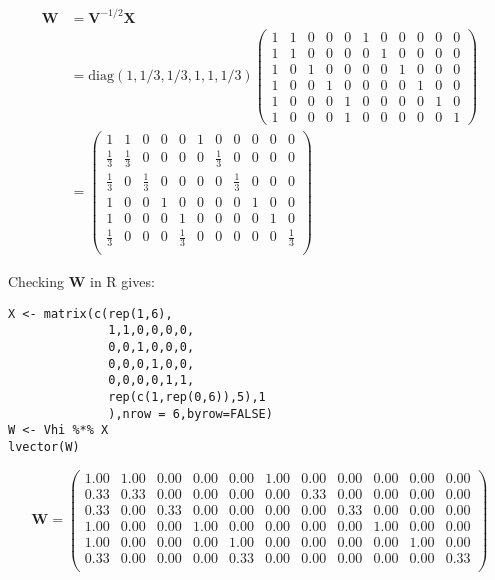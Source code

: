 \documentclass[11pt]{article}
\begin{document}
\begin{align*}
\mathbf{W} &= \mathbf{V}^{-1/2}\mathbf{X} \\
           &= \mathrm{diag}(1,1/3,1/3,1,1,1/3)\begin{pmatrix}
1 & 1 & 0 & 0 & 0 & 1 & 0 & 0 & 0 & 0 & 0 \\
1 & 1 & 0 & 0 & 0 & 0 & 1 & 0 & 0 & 0 & 0 \\
1 & 0 & 1 & 0 & 0 & 0 & 0 & 1 & 0 & 0 & 0 \\
1 & 0 & 0 & 1 & 0 & 0 & 0 & 0 & 1 & 0 & 0 \\
1 & 0 & 0 & 0 & 1 & 0 & 0 & 0 & 0 & 1 & 0 \\
1 & 0 & 0 & 0 & 1 & 0 & 0 & 0 & 0 & 0 & 1 
\end{pmatrix}  \\
 &= 
\begin{pmatrix}{}
  1 & 1 & 0 & 0 & 0 & 1 & 0 & 0 & 0 & 0 & 0 \\ 
  \frac{1}{3} & \frac{1}{3} & 0 & 0 & 0 & 0 & \frac{1}{3} & 0 & 0 & 0 & 0 \\ 
  \frac{1}{3} & 0 & \frac{1}{3} & 0 & 0 & 0 & 0 & \frac{1}{3} & 0 & 0 & 0 \\ 
  1 & 0 & 0 & 1 & 0 & 0 & 0 & 0 & 1 & 0 & 0 \\ 
  1 & 0 & 0 & 0 & 1 & 0 & 0 & 0 & 0 & 1 & 0 \\ 
  \frac{1}{3} & 0 & 0 & 0 & \frac{1}{3} & 0 & 0 & 0 & 0 & 0 & \frac{1}{3} \\ 
  \end{pmatrix}
\end{align*}

Checking \textbf{W} in R gives:

\begin{verbatim}
X <- matrix(c(rep(1,6),
              1,1,0,0,0,0,
              0,0,1,0,0,0,
              0,0,0,1,0,0,
              0,0,0,0,1,1,
              rep(c(1,rep(0,6)),5),1
              ),nrow = 6,byrow=FALSE)
W <- Vhi %*% X
lvector(W)
\end{verbatim}

\[
\mathbf{W} =
\begin{pmatrix}{}
  1.00 & 1.00 & 0.00 & 0.00 & 0.00 & 1.00 & 0.00 & 0.00 & 0.00 & 0.00 & 0.00 \\ 
  0.33 & 0.33 & 0.00 & 0.00 & 0.00 & 0.00 & 0.33 & 0.00 & 0.00 & 0.00 & 0.00 \\ 
  0.33 & 0.00 & 0.33 & 0.00 & 0.00 & 0.00 & 0.00 & 0.33 & 0.00 & 0.00 & 0.00 \\ 
  1.00 & 0.00 & 0.00 & 1.00 & 0.00 & 0.00 & 0.00 & 0.00 & 1.00 & 0.00 & 0.00 \\ 
  1.00 & 0.00 & 0.00 & 0.00 & 1.00 & 0.00 & 0.00 & 0.00 & 0.00 & 1.00 & 0.00 \\ 
  0.33 & 0.00 & 0.00 & 0.00 & 0.33 & 0.00 & 0.00 & 0.00 & 0.00 & 0.00 & 0.33 \\ 
  \end{pmatrix}
\]
\end{document}
